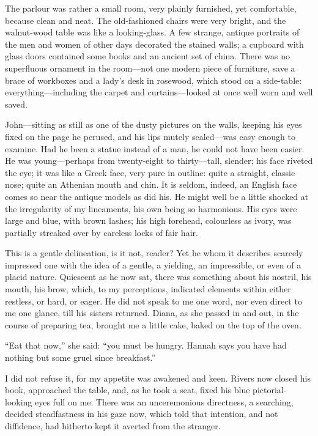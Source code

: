 The parlour was rather a small room, very plainly furnished, yet
comfortable, because clean and neat. The old-fashioned chairs were very
bright, and the walnut-wood table was like a looking-glass. A few
strange, antique portraits of the men and women of other days decorated
the stained walls; a cupboard with glass doors contained some books and
an ancient set of china. There was no superfluous ornament in the
room---not one modern piece of furniture, save a brace of workboxes and
a lady's desk in rosewood, which stood on a side-table:
everything---including the carpet and curtains---looked at once well
worn and well saved.

\Mr{} \St{} John---sitting as still as one of the dusty pictures on the
walls, keeping his eyes fixed on the page he perused, and his lips
mutely sealed---was easy enough to examine. Had he been a statue
instead of a man, he could not have been easier. He was young---perhaps
from twenty-eight to thirty---tall, slender; his face riveted the eye;
it was like a Greek face, very pure in outline: quite a straight,
classic nose; quite an Athenian mouth and chin. It is seldom, indeed,
an English face comes so near the antique models as did his. He might
well be a little shocked at the irregularity of my lineaments, his own
being so harmonious. His eyes were large and blue, with brown lashes;
his high forehead, colourless as ivory, was partially streaked over by
careless locks of fair hair.

This is a gentle delineation, is it not, reader? Yet he whom it
describes scarcely impressed one with the idea of a gentle, a yielding,
an impressible, or even of a placid nature. Quiescent as he now sat,
there was something about his nostril, his mouth, his brow, which, to my
perceptions, indicated elements within either restless, or hard, or
eager. He did not speak to me one word, nor even direct to me one
glance, till his sisters returned. Diana, as she passed in and out, in
the course of preparing tea, brought me a little cake, baked on the top
of the oven.

\enquote{Eat that now,} she said: \enquote{you must be hungry. Hannah
says you have had nothing but some gruel since breakfast.}

I did not refuse it, for my appetite was awakened and keen. \Mr{} Rivers
now closed his book, approached the table, and, as he took a seat, fixed
his blue pictorial-looking eyes full on me. There was an unceremonious
directness, a searching, decided steadfastness in his gaze now, which
told that intention, and not diffidence, had hitherto kept it averted
from the stranger.

